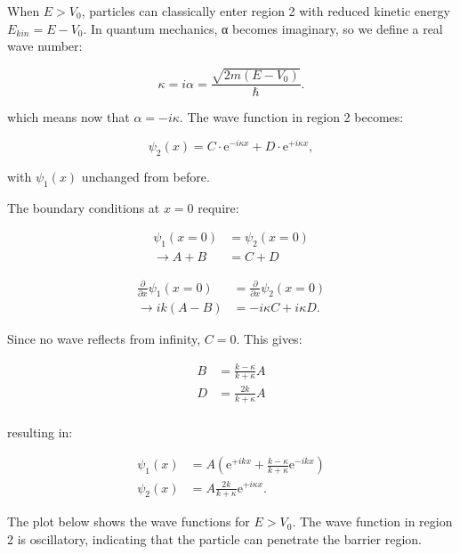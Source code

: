 \documentclass[
  a4paper,
]{book}
\begin{document}
When \(E > V_0\), particles can classically enter region 2 with reduced
kinetic energy \(E_{kin} = E - V_0\). In quantum mechanics, α becomes
imaginary, so we define a real wave number:

\[
\kappa = i \alpha = \frac{\sqrt{2 m \left( E - V_0 \right)}}{\hbar} \mathrm{.}
\]

which means now that \(\alpha = -i\kappa\). The wave function in region
2 becomes:

\[
\psi_2 \left( x \right) = C \cdot \mathrm{e}^{-i \kappa x} + D \cdot \mathrm{e}^{+i \kappa x} \mathrm{,}
\]

with \(\psi_1(x)\) unchanged from before.

The boundary conditions at \(x = 0\) require:

\[
\begin{aligned}
\psi_{\mathrm{1}} \left( x = 0 \right) & =  \psi_{\mathrm{2}} \left( x = 0 \right)\\
\rightarrow A + B & =  C +D
\end{aligned}
\]

\[
\begin{aligned}
\frac{\partial}{\partial x} \psi_{\mathrm{1}} \left( x = 0 \right) & =   \frac{\partial}{\partial x} \psi_{\mathrm{2}} \left( x = 0 \right)\\
\rightarrow i k \left(A - B \right) & =  -i \kappa C + i \kappa D \mathrm{.}
\end{aligned}
\]

Since no wave reflects from infinity, \(C = 0\). This gives:

\[
\begin{aligned}
B & =  \frac{k - \kappa}{k + \kappa} A\\
D & =  \frac{2 k}{k + \kappa} A\\
\end{aligned}
\]

resulting in:

\[
\begin{aligned}
\psi_{\mathrm{1}} \left( x \right) & =  A \left( \mathrm{e}^{+i k x} + \frac{k - \kappa}{ k + \kappa} \mathrm{e}^{-i k x} \right)\\
\psi_{\mathrm{2}} \left( x \right) & =  A \frac{2 k}{ k + \kappa} \mathrm{e}^{+i \kappa x} \mathrm{.}
\end{aligned}
\]

The plot below shows the wave functions for \(E > V_0\). The wave
function in region 2 is oscillatory, indicating that the particle can
penetrate the barrier region.
\end{document}
